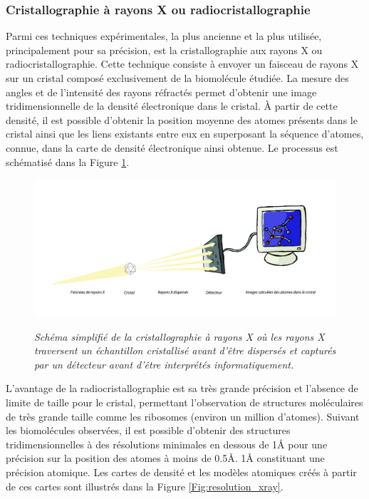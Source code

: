 \subsubsection{Cristallographie à rayons X ou radiocristallographie}

Parmi ces techniques expérimentales, la plus ancienne et la plus utilisée, principalement pour sa précision, est la cristallographie aux rayons X ou radiocristallographie. Cette technique consiste à envoyer un faisceau de rayons X sur un cristal composé exclusivement de la biomolécule étudiée. La mesure des angles et de l'intensité des rayons réfractés permet d'obtenir une image tridimensionnelle de la densité électronique dans le cristal. À partir de cette densité, il est possible d'obtenir la position moyenne des atomes présents dans le cristal ainsi que les liens existants entre eux en superposant la séquence d'atomes, connue, dans la carte de densité électronique ainsi obtenue. Le processus est schématisé dans la Figure \ref{Fig:cristallographie_x_ray}.

\begin{figure}[htb]
  \centering
  {\includegraphics[width=0.9\linewidth]{./figures/ch1/cristallographie_x_ray.pdf}}
    \caption[Schéma simplifié de la cristallographie à rayons X.]{\it Schéma simplifié de la cristallographie à rayons X où les rayons X traversent un échantillon cristallisé avant d'être dispersés et capturés par un détecteur avant d'être interprétés informatiquement. }
    \label{Fig:cristallographie_x_ray}
  \hspace{0.2cm}
\end{figure}

L'avantage de la radiocristallographie est sa très grande précision et l'absence de limite de taille pour le cristal, permettant l'observation de structures moléculaires de très grande taille comme les ribosomes (environ un million d'atomes). 
Suivant les biomolécules observées, il est possible d'obtenir des structures tridimensionnelles à des résolutions minimales en dessous de 1\r{A} pour une précision sur la position des atomes à moins de 0.5\r{A}. 1\r{A} constituant une précision atomique. Les cartes de densité et les modèles atomiques créés à partir de ces cartes sont illustrés dans la Figure \ref{Fig:resolution_xray}.

